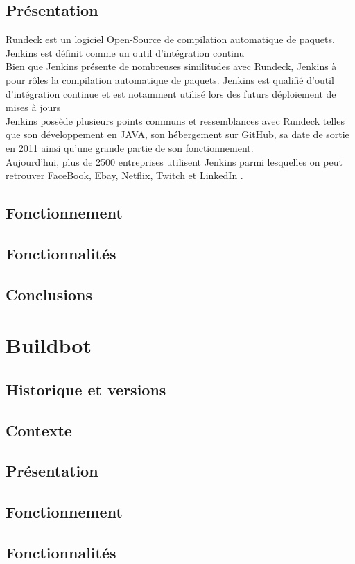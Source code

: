 \documentclass[12pt]{article}
\begin{document}
\subsection{Présentation}
Rundeck est un logiciel Open-Source de compilation automatique de paquets. Jenkins est définit comme un outil d'intégration continu
\\
Bien que Jenkins présente de nombreuses similitudes avec Rundeck, Jenkins à pour rôles la compilation automatique de paquets. Jenkins est qualifié d'outil d'intégration continue et est notamment utilisé lors des futurs déploiement de mises à jours
\\
Jenkins possède plusieurs points communs et ressemblances avec Rundeck telles que son développement en JAVA, son hébergement sur GitHub, sa date de sortie en 2011 ainsi qu'une grande partie de son fonctionnement.
\\
Aujourd'hui, plus de 2500 entreprises utilisent Jenkins parmi lesquelles on peut retrouver FaceBook, Ebay, Netflix, Twitch et LinkedIn .
\subsection{Fonctionnement}
\subsection{Fonctionnalités}
\subsection{Conclusions}

\section{Buildbot}
\subsection{Historique et versions}
\subsection{Contexte}
\subsection{Présentation}
\subsection{Fonctionnement}
\subsection{Fonctionnalités}
\end{document}
